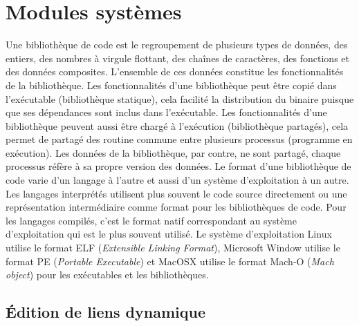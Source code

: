 \chapter{Modules systèmes}
\label{ch:module_systems}





Une bibliothèque de code est le regroupement de plusieurs types de données, des
entiers, des nombres à virgule flottant, des chaînes de caractères, des
fonctions et des données composites. L'ensemble de ces données constitue les
fonctionnalités de la bibliothèque.  Les fonctionnalités d'une bibliothèque
peut être copié dans l'exécutable (bibliothèque statique), cela facilité la
distribution du binaire puisque que ses dépendances sont inclus dans
l'exécutable.  Les fonctionnalités d'une bibliothèque peuvent aussi être chargé
à l'exécution (bibliothèque partagés), cela permet de partagé des routine
commune entre plusieurs processus (programme en exécution). Les données de la
bibliothèque, par contre, ne sont partagé, chaque processus réfère à sa propre
version des données.  Le format d'une bibliothèque de code varie d'un langage à
l'autre et aussi d'un système d'exploitation à un autre. Les langages
interprétés utilisent plus souvent le code source directement ou une
représentation intermédiaire comme format pour les bibliothèques de code.  Pour
les langages compilés, c'est le format natif correspondant au système
d'exploitation qui est le plus souvent utilisé. Le système d'exploitation Linux
utilise le format ELF (\textit{Extensible Linking Format}), Microsoft Window
utilise le format PE (\textit{Portable Executable}) et MacOSX utilise le format
Mach-O (\textit{Mach object}) pour les exécutables et les bibliothèques.



\section{Édition de liens dynamique}

